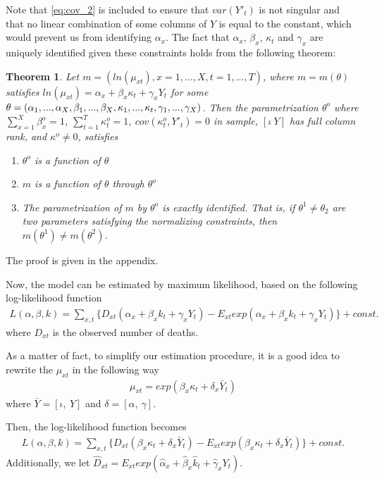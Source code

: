 \documentclass[AER, draftmode]{AEA}
\newtheorem{theorem}{Theorem}[section]
\begin{document}
Note that \ref{eq:cov_2} is included to ensure that $var(Y'_t)$ is not singular and that no linear combination of some columns of $Y$ is equal to the constant, which would prevent us from identifying $\alpha_x$. The fact that $\alpha_x$, $\beta_x$, $\kappa_t$ and $\gamma_x$ are uniquely identified given these constraints holds from the following theorem:
\begin{theorem}\label{the:2}
	Let $m = (ln(\mu_{xt}), x = 1,..., X, t = 1, ..., T)$, where $m = m(\theta)$ satisfies $ln(\mu_{xt}) = \alpha_x + \beta_x \kappa_t + \gamma_x Y_t$ for some $\theta = (\alpha_1, ..., \alpha_X, \beta_1, ..., \beta_X, \kappa_1, ..., \kappa_t, \\ \gamma_1,..., \gamma_X)$. Then the parametrization $\theta^o$ where $\sum_{x=1}^{X} \beta_x^o = 1$, $\sum_{t=1}^{T} \kappa_t^o = 1$, $cov(\kappa_t^o, Y'_t)=0$ in sample, $[\iota \ Y]$ has full column rank, and $\kappa^o \neq 0$, satisfies
	\begin{enumerate}
		\item[(i)] $\theta^o$ is a function of $\theta$
		\item[(ii)] $m$ is a function of $\theta$ through $\theta^o$
		\item[(iii)] The parametrization of $m$ by $\theta^o$ is exactly identified. That is, if $\theta^1 \neq \theta_2$ are two parameters satisfying the normalizing constraints, then $m(\theta^1) \neq m(\theta^2)$.
	\end{enumerate}
\end{theorem}
The proof is given in the appendix.

Now, the model can be estimated by maximum likelihood, based on the following log-likelihood function
\begin{align}
L(\alpha,\beta,k)=\sum_{x,t}\{D_{xt}(\alpha_x+\beta_xk_t+ \gamma_x Y_t)-E_{xt}exp(\alpha_x+\beta_xk_t+ \gamma_x Y_t)\}+const.
\end{align}
where $D_{xt}$ is the observed number of deaths.

As a matter of fact, to simplify our estimation procedure, it is a good idea to rewrite the $\mu_{xt}$ in the following way
\begin{align}
\mu_{xt}=exp(\beta_x \kappa_t + \delta_x \bar{Y}_t)
\end{align}
where $\bar{Y} = [\iota, \ Y]$ and $\delta =[\alpha, \ \gamma]$.

Then, the log-likelihood function becomes
\begin{align}
L(\alpha,\beta,k)=\sum_{x,t}\{D_{xt}(\beta_x \kappa_t + \delta_x \bar{Y}_t)-E_{xt}exp(\beta_x \kappa_t + \delta_x \bar{Y}_t)\}+const.
\end{align}
Additionally, we let $\hat{D}_{xt}=E_{xt}exp(\hat{\alpha}_x+\hat{\beta}_x\hat{k}_t+ \hat{\gamma}_x Y_t)$. 
\end{document}
